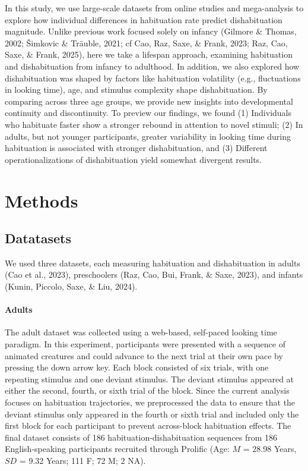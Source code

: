 \documentclass[10pt, letterpaper]{article}
\begin{document}
In this study, we use large-scale datasets from online studies and
mega-analysis to explore how individual differences in habituation rate
predict dishabituation magnitude. Unlike previous work focused solely on
infancy (Gilmore \& Thomas, 2002; Šimkovic \& Träuble, 2021; cf Cao,
Raz, Saxe, \& Frank, 2023; Raz, Cao, Saxe, \& Frank, 2025), here we take
a lifespan approach, examining habituation and dishabituation from
infancy to adulthood. In addition, we also explored how dishabituation
was shaped by factors like habituation volatility (e.g., fluctuations in
looking time), age, and stimulus complexity shape dishabituation. By
comparing across three age groups, we provide new insights into
developmental continuity and discontinuity. To preview our findings, we
found (1) Individuals who habituate faster show a stronger rebound in
attention to novel stimuli; (2) In adults, but not younger participants,
greater variability in looking time during habituation is associated
with stronger dishabituation, and (3) Different operationalizations of
dishabituation yield somewhat divergent results.

\hypertarget{methods}{%
\section{Methods}\label{methods}}

\hypertarget{datatasets}{%
\subsection{Datatasets}\label{datatasets}}

We used three datasets, each measuring habituation and dishabituation in
adults (Cao et al., 2023), preschoolers (Raz, Cao, Bui, Frank, \& Saxe,
2023), and infants (Kunin, Piccolo, Saxe, \& Liu, 2024).

\hypertarget{adults}{%
\paragraph{Adults}\label{adults}}

The adult dataset was collected using a web-based, self-paced looking
time paradigm. In this experiment, participants were presented with a
sequence of animated creatures and could advance to the next trial at
their own pace by pressing the down arrow key. Each block consisted of
six trials, with one repeating stimulus and one deviant stimulus. The
deviant stimulus appeared at either the second, fourth, or sixth trial
of the block. Since the current analysis focuses on habituation
trajectories, we preprocessed the data to ensure that the deviant
stimulus only appeared in the fourth or sixth trial and included only
the first block for each participant to prevent across-block habituation
effects. The final dataset consists of 186 habituation-dishabituation
sequences from 186 English-speaking participants recruited through
Prolific (Age: \(M\) = 28.98 Years, \(SD\) = 9.32 Years; 111 F; 72 M; 2
NA).
\end{document}
